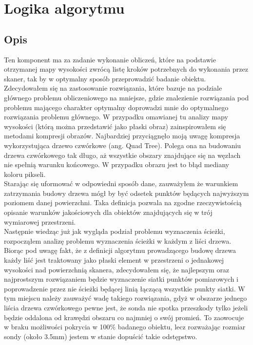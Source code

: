 \documentclass[a4paper,12pt,twoside,openany]{report}
\begin{document}
    \section{Logika algorytmu}
      \subsection{Opis}
        Ten komponent ma za zadanie wykonanie obliczeń, które na podstawie otrzymanej mapy wysokości 
        zwrócą listę kroków potrzebnych do wykonania przez skaner, tak by w optymalny sposób przeprowadzić 
        badanie obiektu. Zdecydowałem się na zastosowanie rozwiązania, które bazuje na podziale głównego problemu 
        obliczeniowego na mniejsze, gdzie znalezienie rozwiązania pod problemu mającego charakter optymalny doprowadzi 
        mnie do optymalnego rozwiązania problemu głównego. W przypadku omawianej tu analizy mapy wysokości (którą można 
        przedstawić jako płaski obraz) zainspirowałem się metodami kompresji obrazów. Najbardziej przyciągnęło moją uwagę 
        kompresja wykorzystująca drzewo czwórkowe (ang. Quad Tree). Polega ona na budowaniu drzewa czwórkowego tak długo, 
        aż wszystkie obszary znajdujące się na węzłach nie spełnią warunku końcowego. W przypadku obrazu jest to błąd mediany 
        koloru pikseli.\\
        Starając się uformować w odpowiedni sposób dane, zauważyłem że warunkiem zatrzymania budowy drzewa mógł by być odsetek 
        punktów będących najwyższym poziomem danej powierzchni. Taka definicja pozwala na zgodne rzeczywistością opisanie 
        warunków jakościowych dla obiektów znajdujących się w trój wymiarowej przestrzeni.\\
        Następnie wiedząc już jak wygląda podział problemu wyznaczenia ścieżki, rozpocząłem analizę problemu wyznaczenia ścieżki 
        w każdym z liści drzewa. Biorąc pod uwagę fakt, że z definicji algorytmu prowadzącego budowę drzewa każdy liść jest 
        traktowany jako płaski element w przestrzeni o jednakowej wysokości nad powierzchnią skanera, zdecydowałem się, że 
        najlepszym oraz najprostszym rozwiązaniem będzie wyznaczenie siatki punktów pomiarowych i poprowadzenie przez nie 
        ścieżki będącej linią łączącą wszystkie punkty siatki. W tym miejscu należy zauważyć wadę takiego rozwiązania, gdyż 
        w obszarze jednego liścia drzewa czwórkowego pewne jest, że sonda nie spotka przeszkody tylko jeżeli będzie oddalona 
        od krawędzi obszaru co najmniej o swój promień. To zaowocuje w braku możliwości pokrycia w 100\% badanego obiektu, lecz 
        rozważając rozmiar sondy (około 3.5mm) jestem w stanie dopuścić takie odstępstwo.
\end{document}
